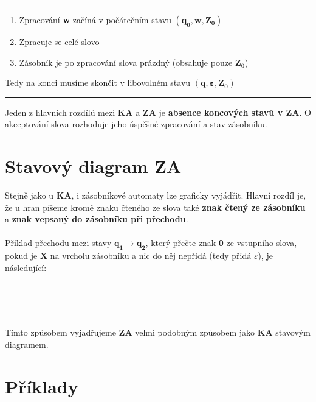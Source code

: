 \documentclass{report}
\begin{document}
\vspace{0.4cm}    
\hrule
\vspace{0.1cm}
\begin{enumerate}
    \item Zpracování \textbf{w} začíná v počátečním stavu $\mathbf{(q_0,w,Z_0)}$
    \item Zpracuje se celé slovo
    \item Zásobník je po zpracování slova prázdný (obsahuje pouze $\mathbf{Z_0}$)
\end{enumerate}
Tedy na konci musíme skončit v libovolném stavu $\mathbf{(q,\varepsilon,Z_0)}$
\vspace{0.1cm}    
\hrule
\vspace{0.4cm}
\noindent Jeden z hlavních rozdílů mezi \textbf{KA} a \textbf{ZA} je \textbf{absence koncových stavů v ZA}. O akceptování slova rozhoduje jeho úspěšné zpracování a stav zásobníku.
\section{Stavový diagram ZA}
Stejně jako u \textbf{KA}, i zásobníkové automaty lze graficky vyjádřit. Hlavní rozdíl je, že u hran píšeme kromě znaku čteného ze slova také \textbf{znak čtený ze zásobníku} a \textbf{znak vepsaný do zásobníku při přechodu}.\\ \\Příklad přechodu mezi stavy $\mathbf{q_1 \rightarrow q_2}$, který přečte znak \textbf{0} ze vstupního slova, pokud je \textbf{X} na vrcholu zásobníku a nic do něj nepřidá (tedy přidá $\varepsilon$), je následující:\\ \\
\begin{center}
\\ \\
\end{center}
Tímto způsobem vyjadřujeme \textbf{ZA} velmi podobným způsobem jako \textbf{KA} stavovým diagramem.
\pagebreak
\section{Příklady}
\end{document}
